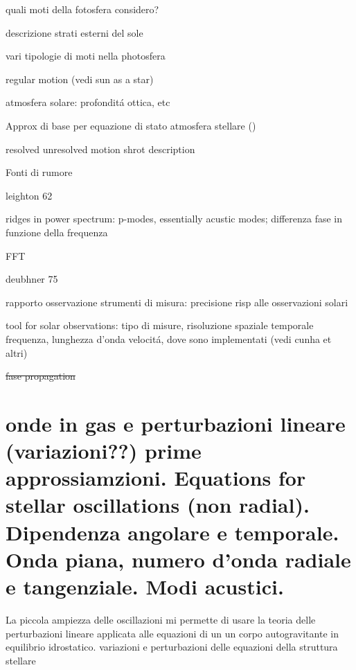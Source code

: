 \documentclass[../main.tex]{subfiles}
\begin{document}
\begin{itemize*}
\item quali moti della fotosfera considero?
\item descrizione strati esterni del sole
\item vari tipologie di moti nella photosfera
\item regular motion (vedi sun as a star)
\item atmosfera solare: profondit\'a ottica, etc
\item Approx di base per equazione di stato atmosfera stellare (\cite{ste74waves})
\item resolved unresolved motion shrot description
\item Fonti di rumore
\item leighton 62 \cite{lei62velocity}
\item ridges in power spectrum: p-modes, essentially acustic modes; differenza fase in funzione della frequenza
\item FFT
\item deubhner 75 \cite{deu75observations}
\item rapporto osservazione strumenti di misura: precisione risp alle osservazioni solari
\item tool for solar observations: tipo di misure, risoluzione spaziale temporale frequenza, lunghezza d'onda velocit\'a, dove sono implementati (vedi cunha et altri)

\item \sout{fase propagation}
\end{itemize*}

\printbibliography[heading=subbibintoc]


\section{onde in gas e perturbazioni lineare (variazioni??) prime approssiamzioni. Equations for stellar oscillations (non radial). Dipendenza angolare e temporale. Onda piana, numero d'onda radiale e tangenziale. Modi acustici.}

La piccola ampiezza delle oscillazioni mi permette di usare la teoria delle perturbazioni lineare applicata alle equazioni di un un corpo autogravitante in equilibrio idrostatico. variazioni e perturbazioni delle equazioni della struttura stellare
\end{document}
